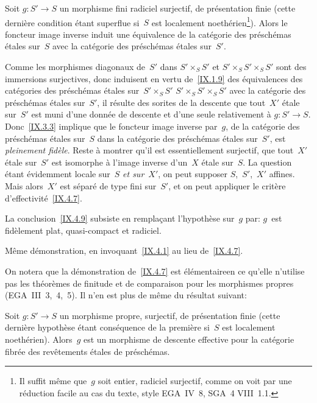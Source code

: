 \begin{theoreme}
\label{IX.4.10}
Soit $g\colon S'\to S$ un morphisme fini radiciel surjectif, de
pr\'esentation finie (cette derni\`ere condition \'etant
superflue si~$S$ est localement noeth\'erien\footnote{Il suffit
m\^eme que~$g$ soit entier, radiciel surjectif, comme on voit par
une r\'eduction facile au cas du texte, style EGA~IV~8, \cf SGA~4
VIII~1.1.}).
Alors le foncteur image inverse induit une \'equivalence de la
cat\'egorie des pr\'esch\'emas \'etales sur~$S$ avec la
cat\'egorie des pr\'esch\'emas \'etales sur~$S'$.
\end{theoreme}

Comme les morphismes diagonaux de~$S'$ dans $S'\times_S S'$ et
$S'\times_S S'\times_S S'$ sont des immersions surjectives, donc
induisent en vertu de~\ref{IX.1.9} des \'equivalences des
cat\'egories des pr\'esch\'emas \'etales sur~$S'\times_S S'$
\resp $S'\times_S S'\times_S S'$ avec la cat\'egorie des
pr\'esch\'emas \'etales sur~$S'$, il r\'esulte des sorites de
la descente \cite{IX.D} que tout~$X'$ \'etale sur~$S'$ est muni d'une
donn\'ee de descente et d'une seule relativement \`a $g\colon
S'\to S$. Donc~\ref{IX.3.3} implique que le foncteur image inverse
par~$g$, de la cat\'egorie des pr\'esch\'emas \'etales sur~$S$
dans la cat\'egorie des pr\'esch\'emas \'etales sur~$S'$, est
\emph{pleinement fidèle}. Reste \`a montrer qu'il est
essentiellement surjectif, \ie que tout~$X'$ \'etale sur~$S'$ est
isomorphe \`a l'image inverse d'un~$X$ \'etale sur~$S$. La
question \'etant \'evidemment locale sur~$S$ \emph{et sur}~$X'$,
on peut supposer $S$,~$S'$,~$X'$ affines. Mais alors~$X'$ est
s\'epar\'e de type fini sur~$S'$, et on peut appliquer le
crit\`ere d'effectivit\'e~\ref{IX.4.7}.

\begin{corollaire}
\label{IX.4.11}
La conclusion~\ref{IX.4.9} subsiste en rempla\c cant l'hypoth\`ese
sur~$g$ par: $g$~est fid\`element plat, quasi-compact et radiciel.
\end{corollaire}

M\^eme d\'emonstration, en invoquant~\ref{IX.4.1} au lieu
de~\ref{IX.4.7}.

On notera que la d\'emonstration de~\ref{IX.4.7} est
\og \'el\'ementaire\fg en ce qu'elle n'utilise pas les
th\'eor\`emes
de
finitude et de comparaison pour les morphismes propres (EGA~III~3,~4,~5). Il n'en est plus de m\^eme du r\'esultat suivant:

\begin{theoreme}
\label{IX.4.12}
Soit $g\colon S'\to S$ un morphisme propre, surjectif, de
pr\'esentation finie (cette derni\`ere hypoth\`ese \'etant
cons\'equence de la premi\`ere si~$S$ est localement
noeth\'erien). Alors~$g$ est un morphisme de descente effective
pour la cat\'egorie fibr\'ee des rev\^etements \'etales de
pr\'esch\'emas.
\end{theoreme}

